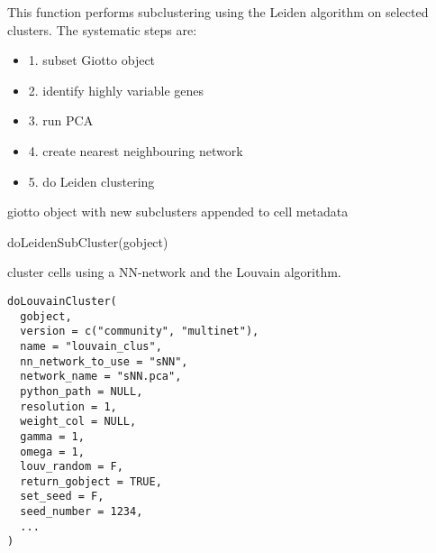 \documentclass[a4paper]{book}
\begin{document}
%
\begin{Details}\relax
This function performs subclustering using the Leiden algorithm on selected clusters.
The systematic steps are:
\begin{itemize}

\item{} 1. subset Giotto object
\item{} 2. identify highly variable genes
\item{} 3. run PCA
\item{} 4. create nearest neighbouring network
\item{} 5. do Leiden clustering

\end{itemize}

\end{Details}
%
\begin{Value}
giotto object with new subclusters appended to cell metadata
\end{Value}
%
\begin{SeeAlso}\relax
{}
\end{SeeAlso}
%
\begin{Examples}
\begin{ExampleCode}
    doLeidenSubCluster(gobject)
\end{ExampleCode}
\end{Examples}
%
\begin{Description}\relax
cluster cells using a NN-network and the Louvain algorithm.
\end{Description}
%
\begin{Usage}
\begin{verbatim}
doLouvainCluster(
  gobject,
  version = c("community", "multinet"),
  name = "louvain_clus",
  nn_network_to_use = "sNN",
  network_name = "sNN.pca",
  python_path = NULL,
  resolution = 1,
  weight_col = NULL,
  gamma = 1,
  omega = 1,
  louv_random = F,
  return_gobject = TRUE,
  set_seed = F,
  seed_number = 1234,
  ...
)
\end{verbatim}
\end{Usage}
%
\end{document}
